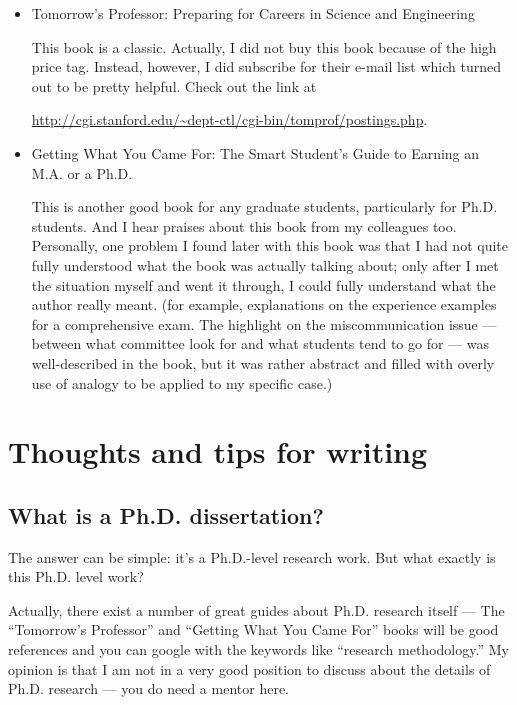 \documentclass[11pt]{article}
\begin{document}
\begin{itemize}
    \item Tomorrow's Professor: Preparing for Careers in Science and
        Engineering

        This book is a classic. Actually, I did not buy this book because of
        the high price tag. Instead, however, I did subscribe for
        their e-mail list which turned out to be pretty helpful.  Check out the
        link at
        \begin{small}\url{http://cgi.stanford.edu/\~dept-ctl/cgi-bin/tomprof/postings.php}.\end{small}

    \item Getting What You Came For: The Smart Student's Guide to Earning an
        M.A. or a Ph.D.

        This is another good book for any graduate students, particularly for
        Ph.D. students. And I hear praises about this book from my colleagues
        too. Personally, one problem I found later with this book was that I
        had not quite fully understood what the book was actually talking
        about; only after I met the situation myself and went it through, I
        could fully understand what the author really meant. (for example,
        explanations on the experience examples for a comprehensive exam. The
        highlight on the miscommunication issue --- between what committee
        look for and what students tend to go for --- was well-described in
        the book, but it was rather abstract and filled with overly use of analogy
        to be applied to my specific case.)


\end{itemize}


\section{Thoughts and tips for writing}

\subsection{What is a Ph.D. dissertation?}
The answer can be simple: it's a Ph.D.-level research work. But what exactly is
this Ph.D. level work? 

Actually, there exist a number of great guides about Ph.D. research itself --- 
The ``Tomorrow's Professor'' and ``Getting What You Came For'' books will be
good references and you can google with the keywords like ``research
methodology.'' My opinion is that I am not in a very good position to discuss
about the details of Ph.D. research --- you do need a mentor here.
\end{document}
